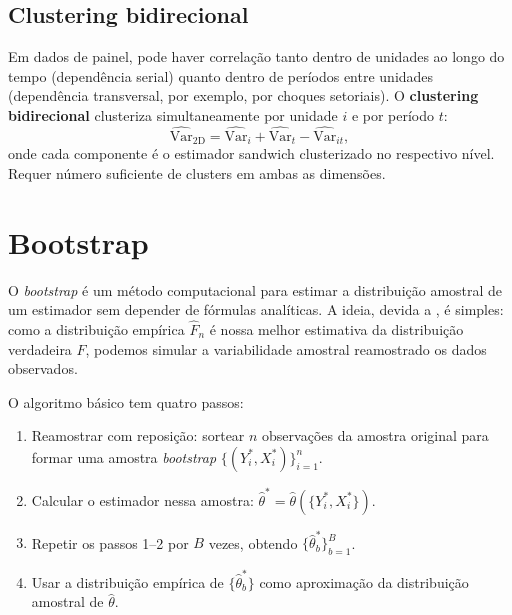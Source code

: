 \subsection*{Clustering bidirecional}

Em dados de painel, pode haver correlação tanto dentro de unidades ao longo do tempo (dependência serial) quanto dentro de períodos entre unidades (dependência transversal, por exemplo, por choques setoriais). O \textbf{clustering bidirecional} \citep{Cameron2011} clusteriza simultaneamente por unidade $i$ e por período $t$:
\begin{equation}
  \widehat{\text{Var}}_{\text{2D}} = \widehat{\text{Var}}_{i} + \widehat{\text{Var}}_{t} - \widehat{\text{Var}}_{it},
  \label{eq:cluster_2d}
\end{equation}
onde cada componente é o estimador sandwich clusterizado no respectivo nível. Requer número suficiente de clusters em ambas as dimensões.


\section{Bootstrap}
\label{sec:bootstrap}

O \textit{bootstrap} é um método computacional para estimar a distribuição amostral de um estimador sem depender de fórmulas analíticas. A ideia, devida a \citet{Efron1979}, é simples: como a distribuição empírica $\hat{F}_n$ é nossa melhor estimativa da distribuição verdadeira $F$, podemos simular a variabilidade amostral reamostrado os dados observados.

O algoritmo básico tem quatro passos:

\begin{enumerate}[leftmargin=*, label=\textbf{\arabic*.}]
  \item Reamostrar com reposição: sortear $n$ observações da amostra original para formar uma amostra \textit{bootstrap} $\{(Y_i^*, X_i^*)\}_{i=1}^n$.
  \item Calcular o estimador nessa amostra: $\hat{\theta}^* = \hat{\theta}(\{Y_i^*, X_i^*\})$.
  \item Repetir os passos 1--2 por $B$ vezes, obtendo $\{\hat{\theta}^*_b\}_{b=1}^B$.
  \item Usar a distribuição empírica de $\{\hat{\theta}^*_b\}$ como aproximação da distribuição amostral de $\hat{\theta}$.
\end{enumerate}

